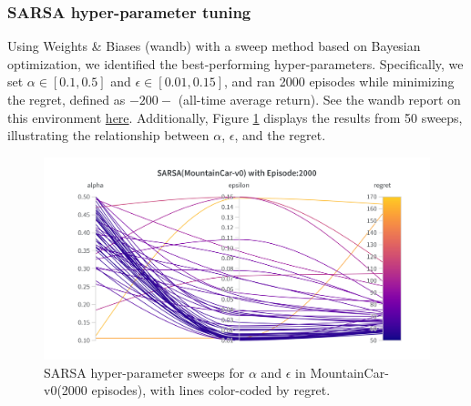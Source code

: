 \documentclass[11pt, a4]{article}
\begin{document}
			\subsubsection{SARSA  hyper-parameter tuning}
				Using Weights \& Biases (wandb) with a sweep method based on Bayesian optimization, we identified the best-performing hyper-parameters. Specifically, we set $\alpha \in [0.1, 0.5]$ and $\epsilon \in [0.01, 0.15]$, and ran 2000 episodes while minimizing the regret, defined as \(-200 -\) (all-time average return). See the wandb report on this environment \href{https://api.wandb.ai/links/ee24e009-iitm/4f545bce}{here}. Additionally, Figure \ref{fig:sarsamountaincar-regret} displays the results from 50 sweeps, illustrating the relationship between $\alpha$, $\epsilon$, and the regret.
				\begin{figure}[H]
					\centering
					\includegraphics[width=1\linewidth]{sarsa-hyp-tuning-mountaincar.png}
					\caption{SARSA hyper-parameter sweeps for $\alpha$ and $\epsilon$ in MountainCar-v0(2000 episodes), with lines color-coded by regret.}
					\label{fig:sarsamountaincar-regret}
				\end{figure}
\end{document}
